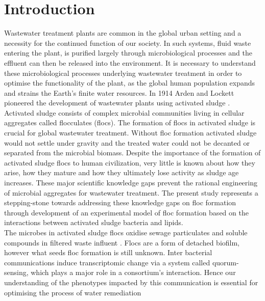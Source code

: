 \documentclass[11pt]{article}
\begin{document}
\newpage
\setcounter{page}{1}
\section{Introduction}
Wastewater treatment plants are common in the global urban setting and a necessity for the continued function of our society. In such systems, fluid waste entering the plant, is purified largely through microbiological processes and the effluent can then be released into the environment. It is necessary to understand these microbiological processes underlying wastewater treatment in order to optimise the functionality of the plant, as the global human population expands and strains the Earth's finite water resources. In 1914 Arden and Lockett pioneered the development of wastewater plants using activated sludge \cite{ardern1914experiments}.\\

Activated sludge consists of complex microbial communities living in cellular aggregates called flocculates (flocs). The formation of flocs in activated sludge is crucial for global wastewater treatment. Without floc formation activated sludge would not settle under gravity and the treated water could not be decanted or separated from the microbial biomass. Despite the importance of the formation of activated sludge flocs to human civilization, very little is known about how they arise, how they mature and how they ultimately lose activity as sludge age increases. These major scientific knowledge gaps prevent the rational engineering of microbial aggregates for wastewater treatment. The present study represents a stepping-stone towards addressing these knowledge gaps on floc formation through development of an experimental model of floc formation based on the interactions between activated sludge bacteria and lipids. \\

The microbes in activated sludge flocs oxidise sewage particulates and soluble compounds in filtered waste influent \cite{Price_95}. Flocs are a form of detached biofilm, however what seeds floc formation is still unknown. Inter bacterial communications induce transcriptomic change via a system called quorum-sensing, which plays a major role in a consortium's interaction\cite{parsek2005sociomicrobiology}. Hence our understanding of the phenotypes impacted by this communication is essential for optimising the process of water remediation \cite{singh2006biofilms}\\
\end{document}
